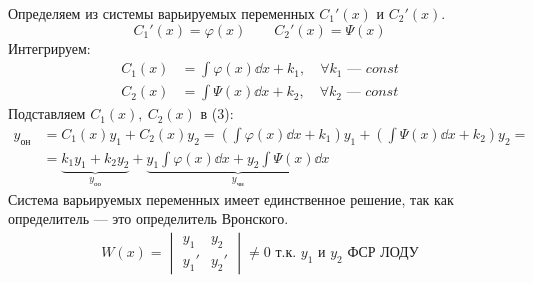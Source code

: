 Определяем из системы варьируемых переменных $C_1'(x)$ и $C_2'(x)$.
\[
    C_1'(x) = \varphi(x)\qquad C_2'(x) = \Psi (x)
\]
Интегрируем:
\begin{align*}
    C_1(x) &= \int \varphi(x)\dd{x} + k_1,\quad \forall k_1 \text{ --- } const \\
    C_2(x) &= \int \Psi(x)\dd{x} + k_2,\quad \forall k_2 \text{ --- } const
\end{align*}
Подставляем $C_1(x),\ C_2(x)$ в (3):
\begin{align*}
    y_{\text{он}} &= C_1(x) y_1 + C_2(x) y_2 = \left(\int \varphi(x)\dd{x} + k_1\right) y_1 + \left(\int \Psi (x)\dd{x} + k_2\right) y_2 = \\
    &= \underbrace{k_1y_1 + k_2y_2}_{y_{\text{оо}}} + \underbrace{y_1 \int \varphi(x) \dd{x} + y_2 \int \Psi(x)\dd{x}}_{y_{\text{чн}}}
\end{align*}
Система варьируемых переменных имеет единственное решение, так как определитель --- это определитель Вронского.
\begin{gather*}
    W(x) = \begin{vmatrix}
        y_1 & y_2 \\
        y_1' & y_2'
    \end{vmatrix} \ne 0\text{ т.к. } y_1 \text{ и } y_2 \text{ ФСР ЛОДУ}
\end{gather*}

